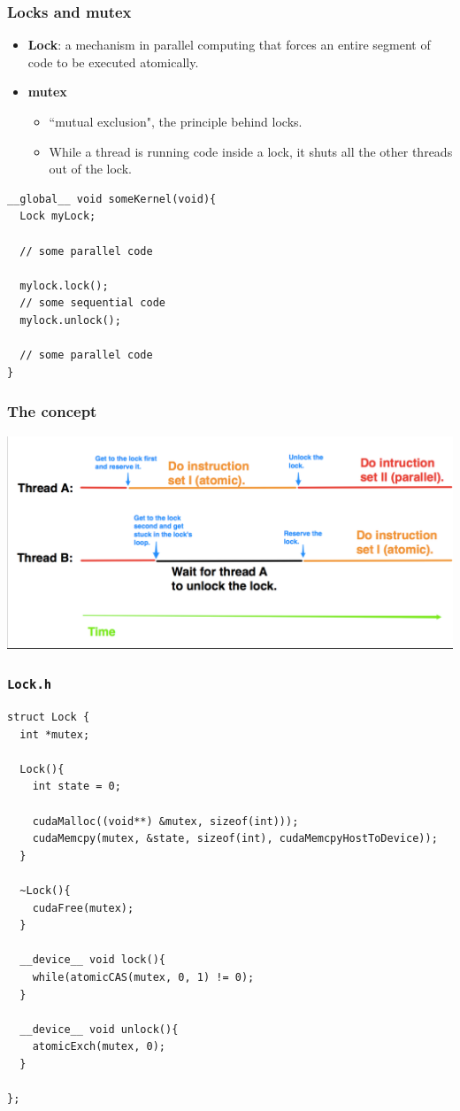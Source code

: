 \documentclass[handout]{beamer}
\numberwithin{equation}{section}
\begin{document}
\begin{frame}[fragile]
\frametitle{Locks and mutex}
\begin{itemize}
\item {\bf Lock}: a mechanism in parallel computing that forces an entire segment of code to be executed atomically.
\pause \item {\bf mutex}
\begin{itemize}
\pause \item ``mutual exclusion", the principle behind locks.
\pause \item While a thread is running code inside a lock, it shuts all the other threads out of the lock.
\end{itemize}
\end{itemize}

\pause \begin{lstlisting}
__global__ void someKernel(void){
  Lock myLock; 
  
  // some parallel code
  
  mylock.lock();
  // some sequential code
  mylock.unlock();
  
  // some parallel code
}
\end{lstlisting}
\end{frame}

\begin{frame}
\frametitle{The concept}
\begin{center}
\includegraphics[scale=.2]{../../fig/lockconcept}
\end{center}
\end{frame}

\begin{frame}[fragile]
\frametitle{{\tt Lock.h}} \lstset{basicstyle=\tiny}
\begin{lstlisting}
struct Lock {
  int *mutex;
  
  Lock(){
    int state = 0;

    cudaMalloc((void**) &mutex, sizeof(int)));
    cudaMemcpy(mutex, &state, sizeof(int), cudaMemcpyHostToDevice));
  }
  
  ~Lock(){
    cudaFree(mutex);
  }

  __device__ void lock(){
    while(atomicCAS(mutex, 0, 1) != 0);
  }
  
  __device__ void unlock(){
    atomicExch(mutex, 0);
  }  
  
};
\end{lstlisting}
\end{frame}
\end{document}
